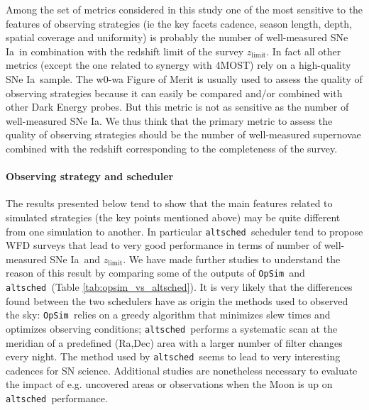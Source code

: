 \documentclass[a4paper,10pt]{article}
\newcommand{\zlimit}{$z_{\mathrm{limit}}$}
\newcommand{\opsim}{{\tt OpSim\ }}
\newcommand{\altsched}{{\tt altsched\ }}
\newcommand{\sne}{{SNe Ia}}
\begin{document}
Among the set of metrics considered in this study one of the most sensitive to the features of observing strategies (ie the key facets cadence, season length, depth, spatial coverage and uniformity) is probably the number of well-measured \sne~in combination with the redshift limit of the survey \zlimit. In fact all other metrics (except the one related to synergy with 4MOST) rely on a high-quality \sne~sample. The w0-wa Figure of Merit is usually used to assess the quality of observing strategies because it can easily be compared and/or combined with other Dark Energy probes. But this metric is not as sensitive as the number of well-measured \sne. We thus think that the primary metric to assess the quality of observing strategies should be the number of well-measured supernovae combined with the redshift corresponding to the completeness of the survey.

\paragraph{Observing strategy and scheduler}
The results presented below tend to show that the main features related to simulated strategies (the key points mentioned above) may be quite different from one simulation to another. In particular \altsched scheduler tend to propose WFD surveys that lead to very good performance in terms of number of well-measured \sne~and \zlimit. We have made further studies to understand the reason of this result by comparing some of the outputs of \opsim and \altsched(Table \ref{tab:opsim_vs_altsched}). It is very likely that the differences found between the two schedulers have as origin the methods used to observed the sky: \opsim relies on a greedy algorithm that minimizes slew times and optimizes observing conditions; \altsched performs a systematic scan at the meridian of a predefined (Ra,Dec) area with a larger number of filter changes every night. The method used by \altsched seems to lead to very interesting cadences for SN science. Additional studies are nonetheless necessary to evaluate the impact of e.g. uncovered areas or observations when the Moon is up on \altsched performance.
\end{document}
